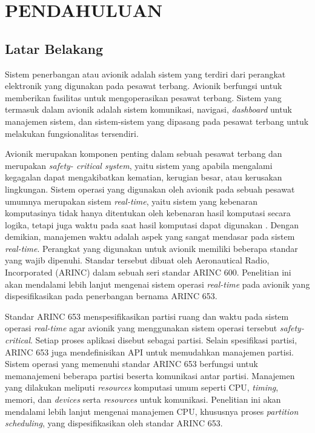 \chapter{PENDAHULUAN}

\section{Latar Belakang}

Sistem penerbangan atau avionik adalah sistem yang terdiri dari perangkat elektronik yang
digunakan pada pesawat terbang. Avionik berfungsi untuk memberikan fasilitas untuk
mengoperasikan pesawat terbang. Sistem yang termasuk dalam avionik adalah sistem komunikasi,
navigasi, \textit{dashboard} untuk manajemen sistem, dan sistem-sistem yang dipasang pada
pesawat terbang untuk melakukan fungsionalitas tersendiri.

Avionik merupakan komponen penting dalam sebuah pesawat terbang dan merupakan \textit{safety\hyp
critical system}, yaitu sistem yang apabila mengalami kegagalan dapat mengakibatkan kematian,
kerugian besar, atau kerusakan lingkungan.  Sistem operasi yang digunakan oleh avionik pada
sebuah pesawat umumnya merupakan sistem \textit{real-time}, yaitu sistem yang kebenaran
komputasinya tidak hanya ditentukan oleh kebenaran hasil komputasi secara logika, tetapi juga
waktu pada saat hasil komputasi dapat digunakan \citep[p.~6]{Shin1994}. Dengan demikian,
manajemen waktu adalah aspek yang sangat mendasar pada sistem \textit{real-time}. Perangkat yang
digunakan untuk avionik memiliki beberapa standar yang wajib dipenuhi. Standar tersebut dibuat
oleh Aeronautical Radio, Incorporated (ARINC) dalam sebuah seri standar ARINC 600. Penelitian
ini akan mendalami lebih lanjut mengenai sistem operasi \textit{real-time} pada avionik yang
dispesifikasikan pada penerbangan bernama ARINC 653.

Standar ARINC 653 menspesifikasikan partisi ruang dan waktu pada sistem operasi
\textit{real-time} agar avionik yang menggunakan sistem operasi tersebut
\textit{safety-critical}. Setiap proses aplikasi disebut sebagai partisi.  Selain spesifikasi
partisi, ARINC 653 juga mendefinisikan API untuk memudahkan manajemen partisi.  Sistem operasi
yang memenuhi standar ARINC 653 berfungsi untuk memanajemeni beberapa partisi beserta komunikasi
antar partisi.  Manajemen yang dilakukan meliputi \textit{resources} komputasi umum seperti CPU,
\textit{timing}, memori, dan \textit{devices} serta \textit{resources} untuk komunikasi.
Penelitian ini akan mendalami lebih lanjut mengenai manajemen CPU, khususnya proses
\textit{partition scheduling}, yang dispesifikasikan oleh standar ARINC 653.

